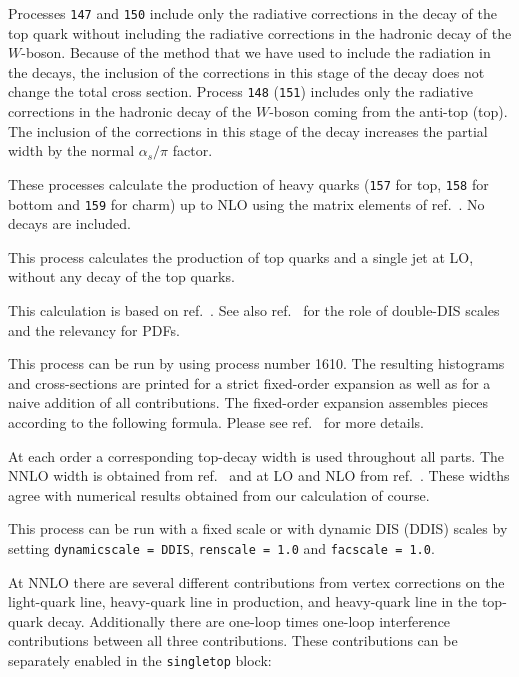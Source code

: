 Processes {\tt 147} and {\tt 150} include only the radiative 
corrections in the decay of the top quark without including 
the radiative corrections in the hadronic decay of the $W$-boson.
Because of the method that we have used to include the radiation in the decays,
the inclusion of the corrections in this stage of the decay does not change the
total cross section.
Process {\tt 148} ({\tt 151}) includes only the radiative corrections
in the hadronic decay of the $W$-boson coming from the anti-top (top).
The inclusion of the corrections in this stage of the decay increases the
partial width by the normal $\alpha_s/\pi$ factor.


These processes calculate the production of heavy quarks
({\tt 157} for top, {\tt 158} for bottom and {\tt 159} for charm) up to NLO 
using the matrix elements of ref.~\cite{Nason:1987xz}. No decays
are included.

This process calculates the production of top quarks and a single jet
at LO, without any decay of the top quarks.


\label{single-top-quark-production-and-decay-at-nnlo}

This calculation is based on ref.~\cite{Campbell:2020fhf}. See also
ref.~\cite{Campbell:2021qgd} for the role of double-DIS scales and the
relevancy for PDFs.

This process can be run by using process number 1610. The resulting
histograms and cross-sections are printed for a strict fixed-order
expansion as well as for a naive addition of all contributions. The
fixed-order expansion assembles pieces according to the following
formula. Please see ref.~\cite{Campbell:2020fhf} for more details.



At each order a corresponding top-decay width is used throughout all
parts. The NNLO width is obtained from ref.~\cite{Blokland:2005vq} and at
LO and NLO from ref.~\cite{Czarnecki:1990kv}. These widths agree with
numerical results obtained from our calculation of course.

This process can be run with a fixed scale or with dynamic DIS (DDIS)
scales by setting \texttt{dynamicscale\ =\ DDIS},
\texttt{renscale\ =\ 1.0} and \texttt{facscale\ =\ 1.0}.

At NNLO there are several different contributions from vertex
corrections on the light-quark line, heavy-quark line in production, and
heavy-quark line in the top-quark decay. Additionally there are one-loop
times one-loop interference contributions between all three
contributions. These contributions can be separately enabled in the
\texttt{singletop} block:

